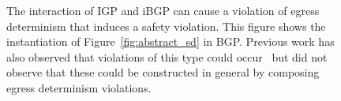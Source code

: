 \begin{figure}[t]
\centering
\begin{psfrags}
%
%

\end{psfrags}
\caption[The interaction of IGP and iBGP can cause a violation of egress
  determinism.]{The interaction of IGP and iBGP can cause a violation of egress
  determinism that induces a safety violation.  This figure shows the
  instantiation of Figure~\ref{fig:abstract_sd} in BGP.  Previous work has
  also observed that violations of this type could occur~\cite{Griffin2002}
  but did not observe that these could be constructed in general by
  composing egress determinism violations.}
\label{fig:sd_violation_rr_osc}
\end{figure}


